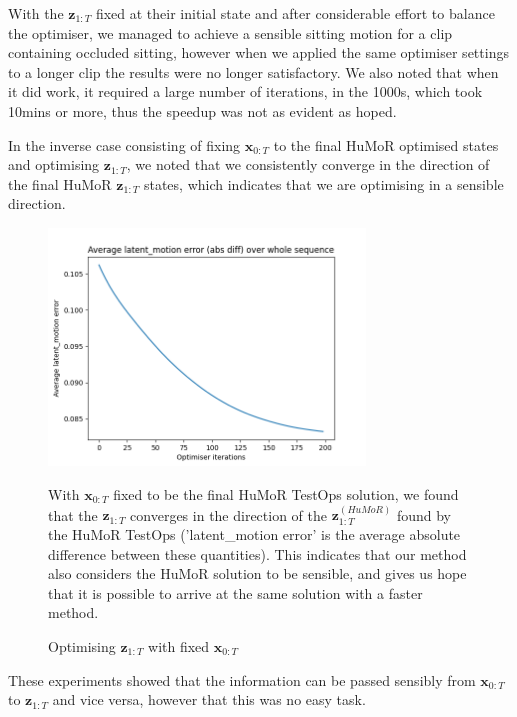 With the $\mathbf{z}_{1:T}$ fixed at their initial state and after considerable effort to balance the optimiser, we managed to achieve a sensible sitting motion for a clip containing occluded sitting, however when we applied the same optimiser settings to a longer clip the results were no longer satisfactory. We also noted that when it did work, it required a large number of iterations, in the 1000s, which took 10mins or more, thus the speedup was not as evident as hoped.

In the inverse case consisting of fixing $\mathbf{x}_{0:T}$ to the final HuMoR optimised states and optimising $\mathbf{z}_{1:T}$, we noted that we consistently converge in the direction of the final HuMoR $\mathbf{z}_{1:T}$ states, which indicates that we are optimising in a sensible direction.

\begin{figure}
    \centering
    \includegraphics[width=0.75\textwidth]{Figures/humor/experiments/avg_latent_motion_error.png}
    \caption{Optimising $\mathbf{z}_{1:T}$ with fixed $\mathbf{x}_{0:T}$}
    \label{fig:zs_converge_to_humor_zs}
    \medskip
    \small
    \raggedright
    With $\mathbf{x}_{0:T}$ fixed to be the final HuMoR TestOps solution, we found that the $\mathbf{z}_{1:T}$ converges in the direction of the $\mathbf{z}_{1:T}^{(HuMoR)}$ found by the HuMoR TestOps ('latent\_motion error' is the average absolute difference between these quantities). This indicates that our method also considers the HuMoR solution to be sensible, and gives us hope that it is possible to arrive at the same solution with a faster method.
\end{figure}

These experiments showed that the information can be passed sensibly from $\mathbf{x}_{0:T}$ to $\mathbf{z}_{1:T}$ and vice versa, however that this was no easy task.

